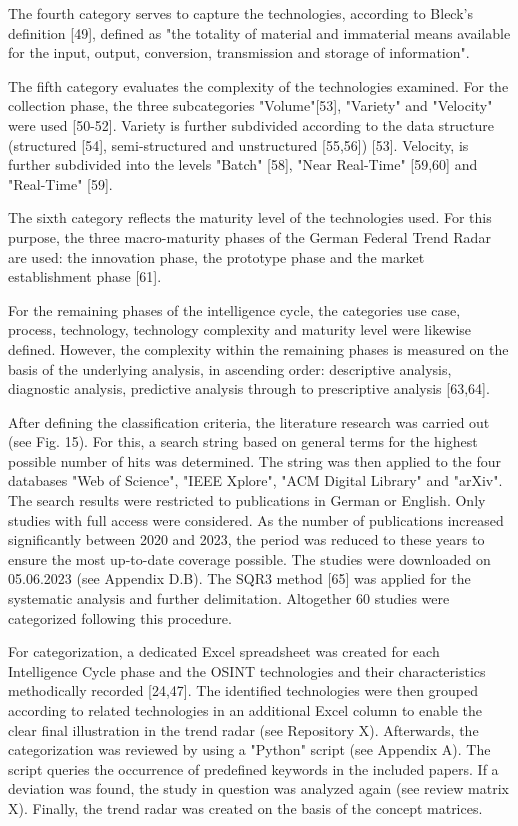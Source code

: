 \documentclass[10pt]{article}
\begin{document}
The fourth category serves to capture the technologies, according to
Bleck's definition [49], defined as "the totality of material and
immaterial means available for the input, output, conversion,
transmission and storage of information".

The fifth category evaluates the complexity of the technologies
examined. For the collection phase, the three subcategories
"Volume"[53], "Variety" and "Velocity" were used [50-52]. Variety
is further subdivided according to the data structure (structured
    [54], semi-structured and unstructured [55,56]) [53]. Velocity,
is further subdivided into the levels "Batch" [58], "Near Real-Time"
[59,60] and "Real-Time" [59].

The sixth category reflects the maturity level of the technologies used.
For this purpose, the three macro-maturity phases of the German Federal
Trend Radar are used: the innovation phase, the prototype phase and
the market establishment phase [61].

For the remaining phases of the intelligence cycle, the categories use
case, process, technology, technology complexity and maturity level
were likewise defined. However, the complexity within the remaining
phases is measured on the basis of the underlying analysis, in
ascending order: descriptive analysis, diagnostic analysis, predictive
analysis through to prescriptive analysis [63,64].

After defining the classification criteria, the literature research
was carried out (see Fig. 15). For this, a search string based on
general terms for the highest possible number of hits was determined.
The string was then applied to the four databases "Web of Science",
"IEEE Xplore", "ACM Digital Library" and "arXiv". The search results
were restricted to publications in German or English. Only studies
with full access were considered. As the number of publications
increased significantly between 2020 and 2023, the period was reduced
to these years to ensure the most up-to-date coverage possible.
The studies were downloaded on 05.06.2023 (see Appendix D.B). The
SQR3 method [65] was applied for the systematic analysis and further
delimitation. Altogether 60 studies were categorized following this
procedure.

For categorization, a dedicated Excel spreadsheet was created for each
Intelligence Cycle phase and the OSINT technologies and their
characteristics methodically recorded [24,47]. The identified
technologies were then grouped according to related technologies in an
additional Excel column to enable the clear final illustration in the
trend radar (see Repository X). Afterwards, the categorization was
reviewed by using a "Python" script (see Appendix A). The script
queries the occurrence of predefined keywords in the included papers.
If a deviation was found, the study in question was analyzed again
(see review matrix X). Finally, the trend radar was created on the
basis of the concept matrices.
\end{document}
